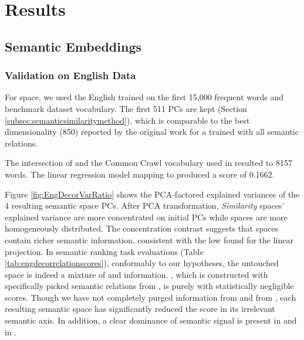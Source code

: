 \chapter{Results} %

\label{chap:results} %

\section{Semantic Embeddings}
\subsection{Validation on English Data}
For  space, we used the English  trained on the first 15,000 frequent words and benchmark dataset vocabulary. The first 511 PCs are kept (Section \ref{subsec:semanticsimilaritymethod}), which is comparable to the best dimensionality (850) reported by the original work \parencite{saediWordNetEmbeddings2018} for a  trained with all semantic relations.

The intersection of  and the Common Crawl vocabulary used in  resulted to 8157 words. The linear regression model mapping  to  produced a  score of 0.1662.

Figure \ref{fig:EngDecorVarRatio} shows the PCA-factored explained variances of the 4 resulting semantic space PCs. After PCA transformation, \emph{Similarity} spaces' explained variance are more concentrated on initial PCs while \association spaces are more homogeneously distributed. The concentration contrast suggests that \association spaces contain richer semantic information, consistent with the low  found for the linear projection. In semantic ranking task evaluations (Table \ref{tab:engdecorrelationscores}), conformably to our hypotheses, the untouched  space is indeed a mixture of \similarity and \association information. , which is constructed with specifically picked semantic relations from , is purely \similarity with statistically negligible \association scores. Though we have not completely purged \similarity information from  and \association from , each resulting semantic space has significantly reduced the score in its irrelevant semantic axis. In addition, a clear dominance of \association semantic signal is present in  and \similarity in . 


